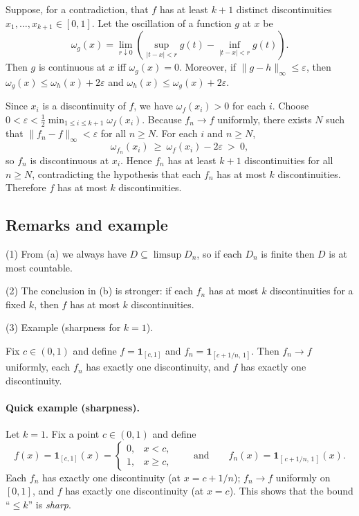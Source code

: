 \documentclass[12pt,a4paper]{article}
\theoremstyle{plain}
\theoremstyle{definition}
\theoremstyle{remark}
\theoremstyle{remark}
\begin{document}
Suppose, for a contradiction, that $f$ has at least $k+1$ distinct discontinuities $x_1,\dots,x_{k+1}\in[0,1]$.
Let the oscillation of a function $g$ at $x$ be
\[
\omega_g(x)=\lim_{r\downarrow 0}\left(\sup_{|t-x|<r} g(t) - \inf_{|t-x|<r} g(t)\right).
\]
Then $g$ is continuous at $x$ iff $\omega_g(x)=0$. Moreover, if $\|g-h\|_\infty\le \varepsilon$, then
$\omega_g(x)\le\omega_h(x)+2\varepsilon$ and $\omega_h(x)\le\omega_g(x)+2\varepsilon$.

Since $x_i$ is a discontinuity of $f$, we have $\omega_f(x_i)>0$ for each $i$.
Choose $0<\varepsilon<\frac12\min_{1\le i\le k+1}\omega_f(x_i)$.
Because $f_n\to f$ uniformly, there exists $N$ such that $\|f_n-f\|_\infty<\varepsilon$ for all $n\ge N$.
For each $i$ and $n\ge N$,
\[
\omega_{f_n}(x_i)\ \ge\ \omega_f(x_i) - 2\varepsilon\ >\ 0,
\]
so $f_n$ is discontinuous at $x_i$. Hence $f_n$ has at least $k+1$ discontinuities for all $n\ge N$,
contradicting the hypothesis that each $f_n$ has at most $k$ discontinuities.
Therefore $f$ has at most $k$ discontinuities.

\subsection*{Remarks and example}

(1) From (a) we always have $D \subseteq \limsup D_n$, so if each $D_n$ is finite then $D$ is at most countable.

(2) The conclusion in (b) is stronger: if each $f_n$ has at most $k$ discontinuities for a fixed $k$, then $f$ has at most $k$ discontinuities.

(3) Example (sharpness for $k=1$).

Fix $c\in(0,1)$ and define $f=\mathbf{1}_{[c,1]}$ and $f_n=\mathbf{1}_{[c+1/n,\,1]}$.
Then $f_n\to f$ uniformly, each $f_n$ has exactly one discontinuity, and $f$ has exactly one discontinuity.

\paragraph{Quick example (sharpness).}
Let $k=1$. Fix a point $c\in(0,1)$ and define
\[
f(x) = \mathbf{1}_{[c,1]}(x) =
\begin{cases}
	0, & x < c,\\
	1, & x \ge c,
\end{cases}
\qquad\text{and}\qquad
f_n(x) = \mathbf{1}_{[\,c+1/n,\,1\,]}(x).
\]
Each $f_n$ has exactly one discontinuity (at $x=c+1/n$);
$f_n \to f$ uniformly on $[0,1]$,
and $f$ has exactly one discontinuity (at $x=c$).
This shows that the bound ``$\le k$'' is \emph{sharp}.
	
\end{document}
